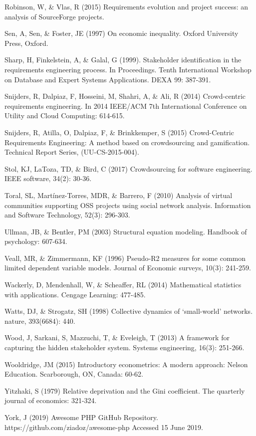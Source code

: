 \begin{thebibliography}{}
Robinson, W, \& Vlas, R (2015) Requirements evolution and project success: an analysis of SourceForge projects.

Sen, A, Sen, \& Foster, JE (1997) On economic inequality. Oxford University Press, Oxford.

Sharp, H, Finkelstein, A, \& Galal, G (1999). Stakeholder identification in the requirements engineering process. In Proceedings. Tenth International Workshop on Database and Expert Systems Applications. DEXA 99: 387-391.

Snijders, R, Dalpiaz, F, Hosseini, M, Shahri, A, \& Ali, R (2014) Crowd-centric requirements engineering. In 2014 IEEE/ACM 7th International Conference on Utility and Cloud Computing: 614-615.

Snijders, R, Atilla, O, Dalpiaz, F, \& Brinkkemper, S (2015) Crowd-Centric Requirements Engineering: A method based on crowdsourcing and gamification. Technical Report Series, (UU-CS-2015-004).

Stol, KJ, LaToza, TD, \& Bird, C (2017) Crowdsourcing for software engineering. IEEE software, 34(2): 30-36.

Toral, SL, Martínez-Torres, MDR, \& Barrero, F (2010) Analysis of virtual communities supporting OSS projects using social network analysis. Information and Software Technology, 52(3): 296-303.

Ullman, JB, \& Bentler, PM (2003) Structural equation modeling. Handbook of psychology: 607-634.

Veall, MR, \& Zimmermann, KF (1996) Pseudo‐R2 measures for some common limited dependent variable models. Journal of Economic surveys, 10(3): 241-259.

Wackerly, D, Mendenhall, W, \& Scheaffer, RL (2014) Mathematical statistics with applications. Cengage Learning: 477-485.

Watts, DJ, \& Strogatz, SH (1998) Collective dynamics of ‘small-world’ networks. nature, 393(6684): 440.

Wood, J, Sarkani, S, Mazzuchi, T, \& Eveleigh, T (2013) A framework for capturing the hidden stakeholder system. Systems engineering, 16(3): 251-266.

Wooldridge, JM (2015) Introductory econometrics: A modern approach: Nelson Education. Scarborough, ON, Canada: 60-62.

Yitzhaki, S (1979) Relative deprivation and the Gini coefficient. The quarterly journal of economics: 321-324.

York, J (2019) Awesome PHP GitHub Repository. https://github.com/ziadoz/awesome-php Accessed 15 June 2019.

\end{thebibliography}

